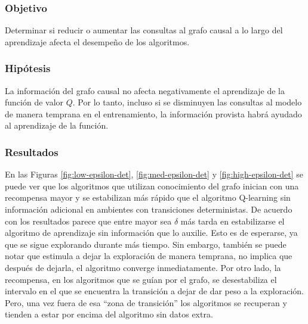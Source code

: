 \subsubsection{Objetivo}

Determinar si reducir o aumentar las consultas al grafo causal a lo largo del aprendizaje afecta el desempeño
de los algoritmos.

\subsubsection{Hipótesis}

La información del grafo causal no afecta negativamente 
el aprendizaje de la función de valor $Q$. Por lo tanto, incluso si se disminuyen las consultas al modelo de manera temprana en el entrenamiento, la información provista habrá
ayudado al aprendizaje de la función.

\subsubsection{Resultados}

En las Figuras \ref{fig:low-epsilon-det}, \ref{fig:med-epsilon-det} y \ref{fig:high-epsilon-det} se puede ver que los algoritmos que utilizan conocimiento del grafo inician con una recompensa mayor y se estabilizan más rápido que el algoritmo Q-learning
sin información adicional en ambientes con transiciones deterministas. 
De acuerdo con los resultados parece que 
entre mayor sea $\delta$ más tarda en estabilizarse
el algoritmo de aprendizaje sin información que lo auxilie. Esto es de esperarse, ya que se sigue explorando durante más tiempo. Sin embargo,
también se puede notar que estimula a dejar
la exploración de manera temprana, no implica que después
de dejarla, el algoritmo converge inmediatamente. Por otro lado, 
la recompensa, en los algoritmos que se guían por el grafo, se desestabiliza
el intervalo en el que se encuentra la transición a dejar de dar peso a 
la exploración. Pero, una vez fuera de esa ``zona de transición'' los
algoritmos se recuperan y tienden a estar por encima del algoritmo sin datos 
extra.


